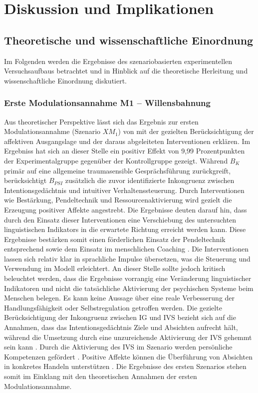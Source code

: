 \chapter{Diskussion und Implikationen} \label{chap:5}

\section{Theoretische und wissenschaftliche Einordnung}
Im Folgenden werden die Ergebnisse des szenariobasierten experimentellen Versuchsaufbaus betrachtet und in Hinblick auf die theoretische Herleitung und wissenschaftliche Einordnung diskutiert.

\subsection{Erste Modulationsannahme M1 – Willensbahnung}
Aus theoretischer Perspektive lässt sich das Ergebnis zur ersten Modulationsannahme (Szenario $XM_1$) von \cite{Kuhl2000The} mit der gezielten Berücksichtigung der affektiven Ausgangslage und der daraus abgeleiteten Interventionen erklären. Im Ergebniss hat sich an dieser Stelle ein positivr Effekt von 9,99 Prozentpunkten der Experimentalgruppe gegenüber der Kontrollgruppe gezeigt. Während $B_K$ primär auf eine allgemeine traumasensible Gesprächsführung zurückgreift, berücksichtigt $B_{PSI}$ zusätzlich die zuvor identifizierte Inkongruenz zwischen Intentionsgedächtnis und intuitiver Verhaltenssteuerung. 
Durch Interventionen wie Bestärkung, Pendeltechnik und Ressourcenaktivierung wird gezielt die Erzeugung positiver Affekte angestrebt. Die Ergebnisse deuten darauf hin, dass durch den Einsatz dieser Interventionen eine Verschiebung des untersuchten linguistischen Indikators in die erwartete Richtung erreicht werden kann. Diese Ergebnisse bestärken somit einen förderlichen Einsatz der Pendeltechnik entsprechend \cite{kuhl2005neue} sowie dem Einsatz im menschlichen Coaching \citep{kuhl2014psi}. Die Interventionen lassen sich relativ klar in sprachliche Impulse übersetzen, was die Steuerung und Verwendung im Modell erleichtert. An dieser Stelle sollte jedoch kritisch beleuchtet werden, dass die Ergebnisse vorrangig eine Veränderung linguistischer Indikatoren und nicht die tatsächliche Aktivierung der psychischen Systeme beim Menschen belegen. Es kann keine Aussage über eine reale Verbesserung der Handlungsfähigkeit oder Selbstregulation getroffen werden.
Die gezielte Berücksichtigung der Inkongruenz zwischen IG und IVS bezieht sich auf die Annahmen, dass das Intentionsgedächtnis Ziele und Absichten aufrecht hält, während die Umsetzung durch eine unzureichende Aktivierung der IVS gehemmt sein kann \citep{Kuhl2000The}. Durch die Aktivierung des IVS im Szenario werden persönliche Kompetenzen gefördert \citep{kuhl2004systemdiagnostik}. Positive Affekte können die Überführung von Absichten in konkretes Handeln unterstützen \citep{kuhl2005neue}. Die Ergebnisse des ersten Szenarios stehen somit im Einklang mit den theoretischen Annahmen der ersten Modulationsannahme.
